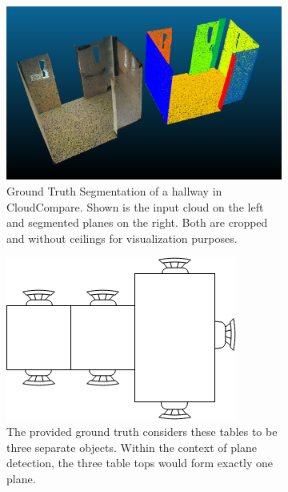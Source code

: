 \documentclass[main.tex]{subfiles}
\begin{document}
\begin{figure} [H]
    \begin{subfigure}{0.5\textwidth}
        \centering
        \includegraphics[width=.9\linewidth]{images/gtseg.png}
        \caption[Ground Truth Segmentation]{Ground Truth Segmentation of a hallway in CloudCompare. Shown is the input cloud on the left and segmented planes on the right.
            Both are cropped and without ceilings for visualization purposes.}
        \label{fig:gtseg}
    \end{subfigure}
    \begin{subfigure} {0.5\textwidth}
        \centering
        \includegraphics[width=0.9\linewidth]{images/tables.png}
        \caption[Ground Truth Table Example]{The provided ground truth considers these tables to be three separate objects. Within the context of
            plane detection, the three table tops would form exactly one plane.}
        \label{fig:tables}
    \end{subfigure}
     \caption[Ground Truth Segmentation figures]{}
\end{figure}
\end{document}
